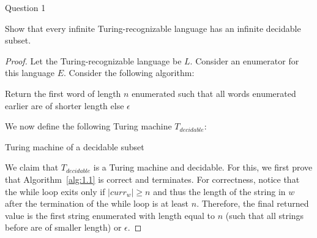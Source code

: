 \begin{solution}{Question 1}\label{ques:1}
    \begin{question}
        Show that every infinite Turing-recognizable language has an infinite decidable subset.
    \end{question}
    \tcblower{}
    \begin{proof}
      Let the Turing-recognizable language be $L$. Consider an enumerator for this language $E$. Consider the following algorithm:
      \begin{algorithm}[H]
        \caption{Return the first word of length $n$ enumerated such that all words enumerated earlier are of shorter length else $\epsilon$}
        \label{alg:1.1}
        \begin{algorithmic}[1]
              \EndIf{}
            \EndWhile{}
            \EndIf{}
          \EndProcedure{}
        \end{algorithmic}
      \end{algorithm}
      We now define the following Turing machine $T_{decidable}$:
      \begin{algorithm}[H]
        \caption{Turing machine of a decidable subset}
        \label{alg:1.2}
        \begin{algorithmic}[1]
            \Else{}
            \EndIf{}
          \EndProcedure{}
        \end{algorithmic}
      \end{algorithm}
      We claim that $T_{decidable}$ is a Turing machine and decidable. For this, we first prove that Algorithm~\ref{alg:1.1} is correct and terminates. For correctness, notice that the while loop exits only if $|curr_w| \geq n$ and thus the length of the string in $w$ after the termination of the while loop is at least $n$. Therefore, the final returned value is the first string enumerated with length equal to $n$ (such that all strings before are of smaller length) or $\epsilon$.\par

\end{proof}
\end{solution}
